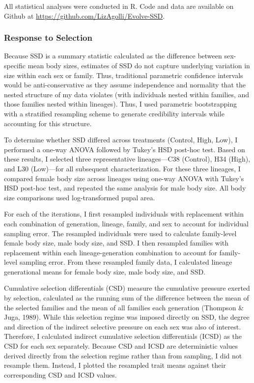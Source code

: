 \documentclass[12pt,reqno,oneside]{report}
\begin{document}
All statistical analyses were conducted in R. Code and data are available on Github at \url{https://github.com/LizAgolli/Evolve-SSD}.

\subsubsection{Response to Selection}

Because SSD is a summary statistic calculated as the difference between sex-specific mean body sizes, estimates of SSD do not capture underlying variation in size within each sex or family. Thus, traditional parametric confidence intervals would be anti-conservative as they assume independence and normality that the nested structure of my data violates (with individuals nested within families, and those families nested within lineages). Thus, I used parametric bootstrapping with a stratified resampling scheme to generate credibility intervals while accounting for this structure. 

To determine whether SSD differed across treatments (Control, High, Low), I performed a one-way ANOVA followed by Tukey's HSD post-hoc test. Based on these results, I selected three representative lineages—C38 (Control), H34 (High), and L30 (Low)—for all subsequent characterization. For these three lineages, I compared female body size across lineages using one-way ANOVA with Tukey's HSD post-hoc test, and repeated the same analysis for male body size. All body size comparisons used log-transformed pupal area. 

For each of the iterations, I first resampled individuals with replacement within each combination of generation, lineage, family, and sex to account for individual sampling error. The resampled individuals were used to calculate family-level female body size, male body size, and SSD. I then resampled families with replacement within each lineage-generation combination to account for family-level sampling error. From these resampled family data, I calculated lineage generational means for female body size, male body size, and SSD. 

Cumulative selection differentials (CSD) measure the cumulative pressure exerted by selection, calculated as the running sum of the difference between the mean of the selected families and the mean of all families each generation (Thompson \& Juga, 1989). While this selection regime was imposed directly on SSD, the degree and direction of the indirect selective pressure on each sex was also of interest. Therefore, I calculated indirect cumulative selection differentials (ICSD) as the CSD for each sex separately. Because CSD and ICSD are deterministic values derived directly from the selection regime rather than from sampling, I did not resample them. Instead, I plotted the resampled trait means against their corresponding CSD and ICSD values.
\end{document}
